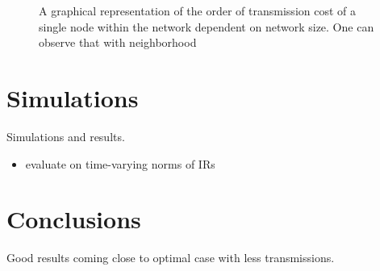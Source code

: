 \documentclass{article}
\begin{document}
\begin{figure}[t]
    \centering
    
    \caption[]{A graphical representation of the order of transmission cost of a single node within the network dependent on network size. One can observe that with neighborhood }
    \label{fig:transcost:bigo}
\end{figure}

\section{Simulations}
\label{sec:simulations}
Simulations and results.
\begin{itemize}
    \item evaluate on time-varying norms of IRs
\end{itemize}

\begin{figure}[t]
    \centering
    
    \caption[]{}
\end{figure}
\begin{figure}[t]
    \centering
    
    \caption[]{}
\end{figure}

\section[]{Conclusions}
\label{sec:conclusions}
Good results coming close to optimal case with less transmissions.


\end{document}
